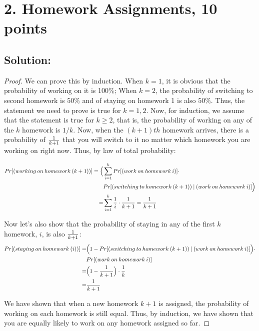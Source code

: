 \documentclass[10pt]{537homework}
\author{Peilun Dai}
\begin{document}
\section*{2. Homework Assignments, 10 points }


\subsection{Solution:}

\begin{proof}
We can prove this by induction. 
When $k=1$, it is obvious that the probability of working on it is 100\%; When $k=2$, the probability of switching to second homework is $50\%$ and of staying on homework 1 is also $50\%$. Thus, the  statement we need to prove is true for $k=1, 2$. Now, for induction, we assume that the statement is true for $k \geq 2$, that is, the probability of working on any of the $k$ homework is $1/k$. Now, when the $(k+1)th$ homework arrives, there is a probability of ${1\over k+1}$ that you will switch to it no matter which homework you are working on right now. Thus, by law of total probability:

\begin{equation*}
	\begin{aligned}
		Pr [(working\:on\:homework\:(k+1))]  = \Big( &\sum_{i=1}^k Pr [(work\:on\:homework\:i)]\cdot \\
		& Pr[(switching\:to\:homework\:(k+1))\:|\: (work\:on\:homework\:i)]\Big) \\
		= & \sum_{i=1}^k {1 \over i}\cdot {1 \over k+1} = {1 \over k+1} \\
	\end{aligned}
\end{equation*}

Now let's also show that the probability of staying in any of the first $k$ homework, $i$, is also ${1\over k+1}$:
\begin{equation*}
	\begin{aligned}
		Pr [(staying\:on\:homework\:(i))]   = &  \Big(1 - Pr[(switching\:to\:homework\:(k+1))\:|\: (work\:on\:homework\:i)]\Big) \cdot \\
		 & Pr [(work\:on\:homework\:i)]  \\
		= &  \Big( 1 - {1\over k+1} \Big) \cdot {1 \over k} \\
		= & {1 \over k + 1}
	\end{aligned}
\end{equation*}

We have shown that when a new homework $k+1$ is assigned, the probability of working on each homework is still equal. Thus, by induction, we have shown that you are equally likely to work on any homework assigned so far. 
	
\end{proof}
\end{document}
